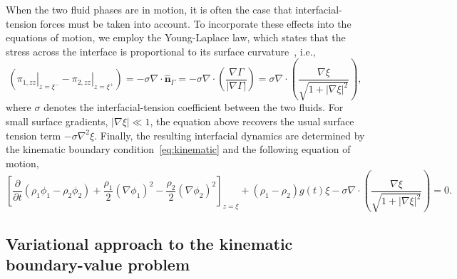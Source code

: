\documentclass[a4paper]{jpconf}
\newcommand{\unvec}[1]{\bm{\hat{#1}}}
\begin{document}
When the two fluid phases are in motion, it is often the case that interfacial-tension forces must be taken into account. To incorporate these effects into the equations of motion, we employ the Young-Laplace law, which states that the stress across the interface is proportional to its surface curvature~\cite{Landau2013Fluid6}, i.e.,
\begin{equation}
    \label{eq:YoungLaplace}
    \left(\left.\pi_{1,zz}\right|_{z=\xi^-}-\left.\pi_{2,zz}\right|_{z=\xi^+}\right)=-\sigma\nabla\cdot\unvec{n}_\Gamma=-\sigma\nabla\cdot\left(\frac{\nabla\Gamma}{|\nabla\Gamma|}\right)=\sigma\nabla\cdot\left(\frac{\nabla\xi}{\sqrt{1+|\nabla\xi|^2}}\right),
\end{equation}
where $\sigma$ denotes the interfacial-tension coefficient between the two fluids. For small surface gradients, $|\nabla\xi|\ll 1$, the equation above recovers the usual surface tension term $-\sigma\nabla^2\xi$. Finally, the resulting interfacial dynamics are determined by the kinematic boundary condition~\eqref{eq:kinematic} and the following equation of motion,
\begin{equation}
\label{eq:interfacialDyn}
    \left[\frac{\partial}{\partial t}\left(\rho_1\phi_1-\rho_2\phi_2\right)+\frac{\rho_1}{2}\left(\nabla\phi_1\right)^2-\frac{\rho_2}{2}\left(\nabla\phi_2\right)^2\right]_{z=\xi}
    +(\rho_1-\rho_2)g(t)\xi
    -\sigma\nabla\cdot\left(\frac{\nabla\xi}{\sqrt{1+|\nabla\xi|^2}}\right)=0.
\end{equation}


\subsection{Variational approach to the kinematic boundary-value problem}
\end{document}
